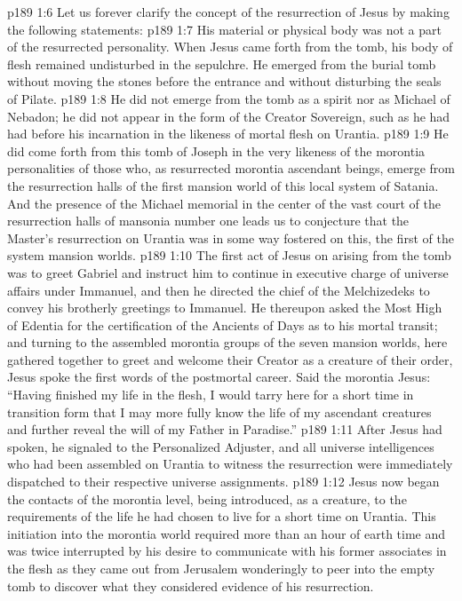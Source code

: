 \vs p189 1:6 Let us forever clarify the concept of the resurrection of Jesus by making the following statements:
\pc \vs p189 1:7 \bibnobreakspace His material or physical body was not a part of the resurrected personality. When Jesus came forth from the tomb, his body of flesh remained undisturbed in the sepulchre. He emerged from the burial tomb without moving the stones before the entrance and without disturbing the seals of Pilate.
\pc \vs p189 1:8 \bibnobreakspace He did not emerge from the tomb as a spirit nor as Michael of Nebadon; he did not appear in the form of the Creator Sovereign, such as he had had before his incarnation in the likeness of mortal flesh on Urantia.
\pc \vs p189 1:9 \bibnobreakspace He did come forth from this tomb of Joseph in the very likeness of the morontia personalities of those who, as resurrected morontia ascendant beings, emerge from the resurrection halls of the first mansion world of this local system of Satania. And the presence of the Michael memorial in the center of the vast court of the resurrection halls of mansonia number one leads us to conjecture that the Master’s resurrection on Urantia was in some way fostered on this, the first of the system mansion worlds.
\pc \vs p189 1:10 The first act of Jesus on arising from the tomb was to greet Gabriel and instruct him to continue in executive charge of universe affairs under Immanuel, and then he directed the chief of the Melchizedeks to convey his brotherly greetings to Immanuel. He thereupon asked the Most High of Edentia for the certification of the Ancients of Days as to his mortal transit; and turning to the assembled morontia groups of the seven mansion worlds, here gathered together to greet and welcome their Creator as a creature of their order, Jesus spoke the first words of the postmortal career. Said the morontia Jesus: \textcolor{ubdarkred}{“Having finished my life in the flesh, I would tarry here for a short time in transition form that I may more fully know the life of my ascendant creatures and further reveal the will of my Father in Paradise.”}
\vs p189 1:11 After Jesus had spoken, he signaled to the Personalized Adjuster, and all universe intelligences who had been assembled on Urantia to witness the resurrection were immediately dispatched to their respective universe assignments.
\vs p189 1:12 Jesus now began the contacts of the morontia level, being introduced, as a creature, to the requirements of the life he had chosen to live for a short time on Urantia. This initiation into the morontia world required more than an hour of earth time and was twice interrupted by his desire to communicate with his former associates in the flesh as they came out from Jerusalem wonderingly to peer into the empty tomb to discover what they considered evidence of his resurrection.
